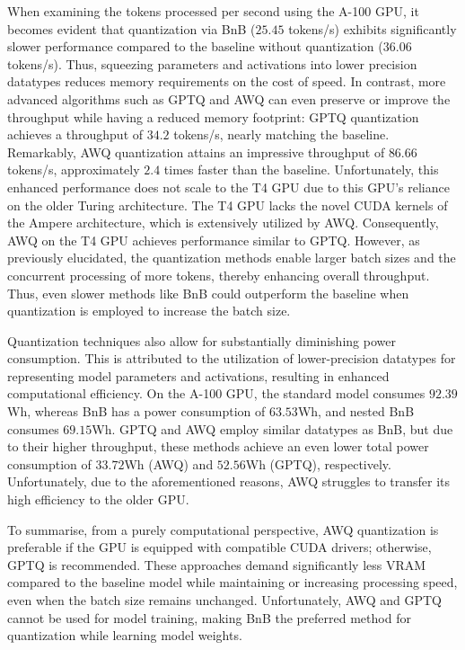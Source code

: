 \documentclass[conference]{IEEEtran}
\begin{document}
When examining the tokens processed per second using the A-100 GPU, it becomes evident that quantization via BnB ($25.45$ tokens/s) exhibits significantly slower performance compared to the baseline without quantization ($36.06$ tokens/s).
Thus, squeezing parameters and activations into lower precision datatypes reduces memory requirements on the cost of speed.
In contrast, more advanced algorithms such as GPTQ and AWQ can even preserve or improve the throughput while having a reduced memory footprint:
GPTQ quantization achieves a throughput of $34.2$ tokens/s, nearly matching the baseline. Remarkably, AWQ quantization attains an impressive throughput of $86.66$ tokens/s, approximately $2.4$ times faster than the baseline.
Unfortunately, this enhanced performance does not scale to the T4 GPU due to this GPU's reliance on the older Turing architecture. The T4 GPU lacks the novel CUDA kernels of the Ampere architecture, which is extensively utilized by AWQ. Consequently, AWQ on the T4 GPU achieves performance similar to GPTQ.
However, as previously elucidated, the quantization methods enable larger batch sizes and the concurrent processing of more tokens, thereby enhancing overall throughput. Thus, even slower methods like BnB could outperform the baseline when quantization is employed to increase the batch size.

Quantization techniques also allow for substantially diminishing power consumption. This is attributed to the utilization of lower-precision datatypes for representing model parameters and activations, resulting in enhanced computational efficiency. On the A-100 GPU, the standard model consumes $92.39$Wh, whereas BnB has a power consumption of $63.53$Wh, and nested BnB consumes $69.15$Wh. GPTQ and AWQ employ similar datatypes as BnB, but due to their higher throughput, these methods achieve an even lower total power consumption of $33.72$Wh (AWQ) and $52.56$Wh (GPTQ), respectively.
Unfortunately, due to the aforementioned reasons, AWQ struggles to transfer its high efficiency to the older GPU.

To summarise, from a purely computational perspective, AWQ quantization is preferable if the GPU is equipped with compatible CUDA drivers; otherwise, GPTQ is recommended. These approaches demand significantly less VRAM compared to the baseline model while maintaining or increasing processing speed, even when the batch size remains unchanged. Unfortunately, AWQ and GPTQ cannot be used for model training, making BnB the preferred method for quantization while learning model weights.
\end{document}

